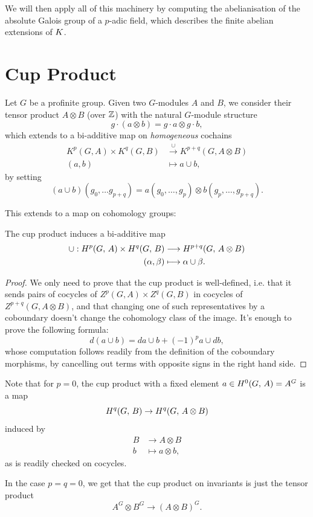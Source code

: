 \documentclass[a4paper, oneside]{memoir}
\begin{document}
We will then apply all of this machinery by computing the abelianisation of the absolute Galois group of a $p$-adic field, which describes the finite abelian extensions of $K$.

\section{Cup Product}

Let $G$ be a profinite group. Given two $G$-modules $A$ and $B$, we consider their tensor product $A\otimes B$ (over $\mathbb{Z}$) with the natural $G$-module structure
\[
    g\cdot (a\otimes b)=g\cdot a\otimes g\cdot b,
\]
which extends to a bi-additive map on \textit{homogeneous} cochains
\begin{align*}
    K^p(G,A)\times K^q(G,B) & \overset{\cup}{\longrightarrow} K^{p+q}(G,A\otimes B) \\
    (a,b)                   & \mapsto a\cup b,
\end{align*}
by setting
\[
    (a\cup b)(g_0,\dots g_{p+q})=a(g_0,\dots,g_p)\otimes b(g_p,\dots,g_{p+q}).
\]

This extends to a map on cohomology groups:

\begin{theorem}\label{thm:Cup}
    The cup product induces a bi-additive map
    \begin{align*}
        \cup: H^{p}( G, \, A )\times H^{q}( G, \, B ) & \longrightarrow H^{p+q}( G, \, A\otimes B ) \\
        (\alpha,\beta)                     & \longmapsto \alpha\cup\beta.
    \end{align*}
\end{theorem}

\begin{proof}
    We only need to prove that the cup product is well-defined, i.e. that it sends pairs of cocycles of $Z^p(G,A)\times Z^q(G,B)$ in cocycles of $Z^{p+q}(G,A\otimes B)$, and that changing one of such representatives by a coboundary doesn't change the cohomology class of the image.
    It's enough to prove the following formula:
    \begin{equation}\label{eq:DiffCup}
        d(a\cup b)=da\cup b+(-1)^pa\cup d b,
    \end{equation}
    whose computation follows readily from the definition of the coboundary morphisms, by cancelling out terms with opposite signs in the right hand side.
\end{proof}

\begin{remark}\label{rm:Cup0n}
    Note that for $p=0$, the cup product with a fixed element $a\in H^{0}( G, \, A )=A^G$ is a map
    \[
        H^{q}( G, \, B )\to H^{q}( G, \, A\otimes B )
    \]
    induced by
    \begin{align*}
        B & \longrightarrow A\otimes B \\
        b & \longmapsto a\otimes b,
    \end{align*}
    as is readily checked on cocycles.

    In the case $p=q=0$, we get that the cup product on invariants is just the tensor product $$A^G\otimes B^G\to (A\otimes B)^G.$$
\end{remark}
\end{document}
